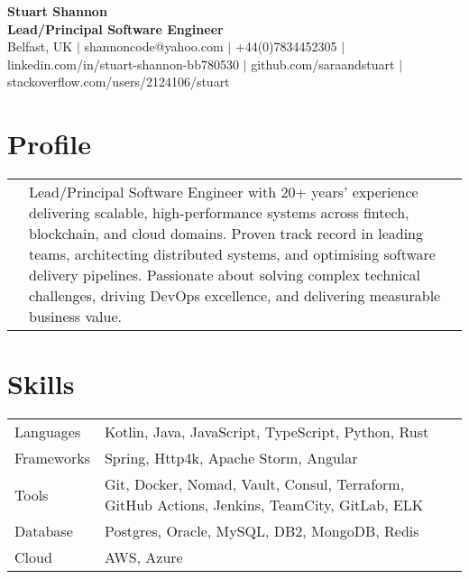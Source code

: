 \documentclass[2pt,a4paper]{article}
\newlength{\datecolumn}
\newlength{\textcolumn}
\begin{document}
\begin{center}
    {\LARGE \textbf{Stuart Shannon}} \\
    {\normalsize \textbf{Lead/Principal Software Engineer}} \\
    \vspace{0.2cm}
    Belfast, UK \quad \(|\) \quad shannoncode@yahoo.com \quad \(|\) \quad +44(0)7834452305 \quad \(|\) \quad linkedin.com/in/stuart-shannon-bb780530 \quad \(|\) \quad github.com/saraandstuart \quad \(|\) \quad stackoverflow.com/users/2124106/stuart 
\end{center}

\section*{Profile}
\begin{tabular}{p{\datecolumn} p{\textcolumn}}
& Lead/Principal Software Engineer with 20+ years’ experience delivering scalable, high-performance systems across fintech, blockchain, and cloud domains. Proven track record in leading teams, architecting distributed systems, and optimising software delivery pipelines. Passionate about solving complex technical challenges, driving DevOps excellence, and delivering measurable business value. \\
\end{tabular}

\section*{Skills}
\begin{tabular}{p{\datecolumn} p{\textcolumn}}
Languages  & Kotlin, Java, JavaScript, TypeScript, Python, Rust \\
Frameworks & Spring, Http4k, Apache Storm, Angular \\
Tools      & Git, Docker, Nomad, Vault, Consul, Terraform, GitHub Actions, Jenkins, TeamCity, GitLab, ELK \\
Database   & Postgres, Oracle, MySQL, DB2, MongoDB, Redis \\
Cloud      & AWS, Azure \\
\end{tabular}

\end{document}
